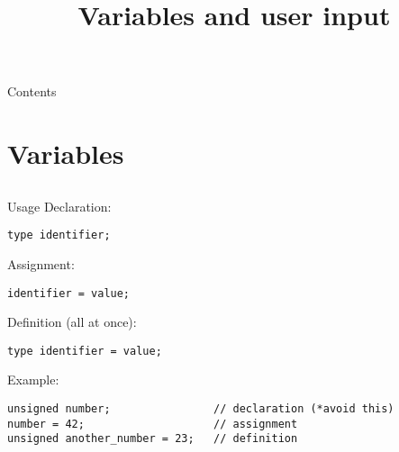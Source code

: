 
\usepackage{tabularx}

\newcommand{\topic}{
    Variables and user input
}

\title{\topic}
\supertitle{\course}
\date{}



\maketitle

\begin{frame}{Contents}
    \tableofcontents
\end{frame}

\section{Variables}
\subsection{}

\begin{frame}[fragile]{Usage}
    Declaration:
    \begin{lstlisting}[numbers=none,basicstyle=\itshape\footnotesize]
type identifier;
\end{lstlisting}
    Assignment: 
    \begin{lstlisting}[numbers=none,basicstyle=\itshape\footnotesize]
identifier = value;
\end{lstlisting}
    Definition (all at once):
    \begin{lstlisting}[numbers=none,basicstyle=\itshape\footnotesize]
type identifier = value;
\end{lstlisting}
    Example:
    \begin{lstlisting}[numbers=none]
unsigned number;                // declaration (*avoid this)
number = 42;                    // assignment
unsigned another_number = 23;   // definition

\end{lstlisting}
\end{frame}

